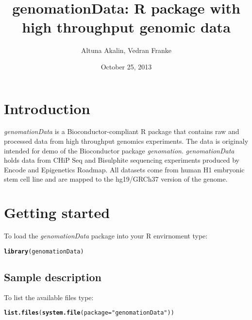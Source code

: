 \documentclass[12pt]{article}\usepackage[]{graphicx}\usepackage[]{color}
\author{Altuna Akalin, Vedran Franke}
\title{\textsf{genomationData: R package with high throughput genomic data}}
\date{October 25, 2013}
\makeatletter
\newcommand{\hlstr}[1]{\textcolor[rgb]{0.192,0.494,0.8}{#1}}%
\newcommand{\hlstd}[1]{\textcolor[rgb]{0.345,0.345,0.345}{#1}}%
\newcommand{\hlkwc}[1]{\textcolor[rgb]{0.333,0.667,0.333}{#1}}%
\newcommand{\hlkwd}[1]{\textcolor[rgb]{0.737,0.353,0.396}{\textbf{#1}}}%
\newenvironment{kframe}{%
 \def\at@end@of@kframe{}%
 \ifinner\ifhmode%
  \def\at@end@of@kframe{\end{minipage}}%
  \begin{minipage}{\columnwidth}%
 \fi\fi%
 \def\FrameCommand##1{\hskip\@totalleftmargin \hskip-\fboxsep
 \colorbox{shadecolor}{##1}\hskip-\fboxsep
     \hskip-\linewidth \hskip-\@totalleftmargin \hskip\columnwidth}%
 \MakeFramed {\advance\hsize-\width
   \@totalleftmargin\z@ \linewidth\hsize
   \@setminipage}}%
 {\par\unskip\endMakeFramed%
 \at@end@of@kframe}
\newenvironment{knitrout}{}{} %
\newcommand{\Rpackage}[1]{{\textit{#1}}}
\makeatother
\begin{document}
\maketitle

\tableofcontents

\section{Introduction}

\Rpackage{genomationData} is a Bioconductor-compliant R package that contains raw and processed data from high throughput genomics experiments. The data is originaly intended for demo of the Bioconductor package \Rpackage{genomation}.
\Rpackage{genomationData} holds data from CHiP Seq and Bisulphite sequencing experiments produced by Encode and Epigenetics Roadmap. All datasets come from human H1 embryonic stem cell line and are mapped to the hg19/GRCh37 version of the genome.


\section{Getting started}

To load the \Rpackage{genomationData} package into your R envirnoment type:
\begin{knitrout}
\color{fgcolor}\begin{kframe}
\begin{alltt}
\hlkwd{library}\hlstd{(genomationData)}
\end{alltt}
\end{kframe}
\end{knitrout}


\subsection{Sample description}
To list the available files type:
\begin{knitrout}
\color{fgcolor}\begin{kframe}
\begin{alltt}
\hlkwd{list.files}\hlstd{(}\hlkwd{system.file}\hlstd{(}\hlkwc{package} \hlstd{=} \hlstr{"genomationData"}\hlstd{))}
\end{alltt}
\end{kframe}
\end{knitrout}
\end{document}
